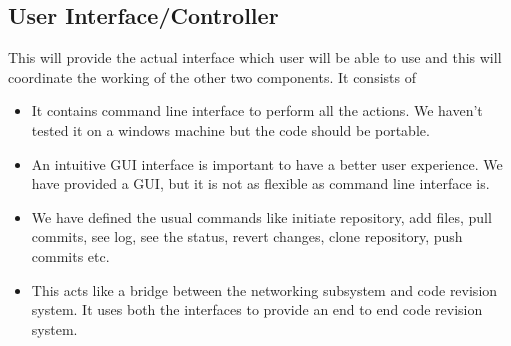 \documentclass[12pt]{article}
\begin{document}
\subsection{User Interface/Controller}
This will provide the actual interface which user will be able to use and this
will coordinate the working of the other two components.
It consists of
\begin{itemize}
\item It contains command line interface to perform all the actions. We
  haven't tested it on a windows machine but the code should be portable.
\item An intuitive GUI interface is important to have a better user
  experience. We have provided a GUI, but it is not as flexible as command
  line interface is.
\item We have defined the usual commands like initiate repository, add files,
  pull commits, see log, see the status, revert changes, clone repository,
  push commits etc.
\item This acts like a bridge between the networking subsystem and code
  revision system. It uses both the interfaces to provide an end to end code
  revision system.
\end{itemize}
\end{document}
